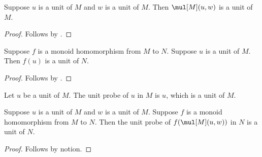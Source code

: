 

\begin{classification}\label{horn_unit_product}
    Suppose $u$ is a unit of $M$ and $w$ is a unit of $M$.
    Then $\mul[M](u,w)$ is a unit of $M$.
\end{classification}
\begin{proof}
    Follows by .
\end{proof}

\begin{classification}\label{horn_unit_image}
    Suppose $f$ is a monoid homomorphism from $M$ to $N$.
    Suppose $u$ is a unit of $M$.
    Then $f(u)$ is a unit of $N$.
\end{classification}
\begin{proof}
    Follows by .
\end{proof}

\begin{definition}\label{horn_unit_probe}
    Let $u$ be a unit of $M$.
    The unit probe of $u$ in $M$ is $u$, which is a unit of $M$.
\end{definition}

\begin{proposition}\label{horn_unit_contract}
    Suppose $u$ is a unit of $M$ and $w$ is a unit of $M$.
    Suppose $f$ is a monoid homomorphism from $M$ to $N$.
    Then the unit probe of $f(\mul[M](u,w))$ in $N$ is a unit of $N$.
\end{proposition}
\begin{proof}
    Follows by notion.
\end{proof}
